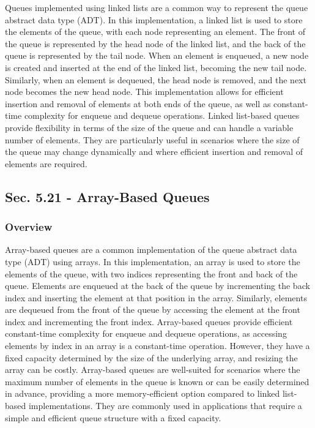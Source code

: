 Queues implemented using linked lists are a common way to represent the queue abstract data type (ADT). In this implementation, a linked list is used to store the elements of the queue, with each node representing an element. The front of the queue is represented by the head node of the linked list, and the back of the queue is represented by the tail node. When an element is enqueued, 
a new node is created and inserted at the end of the linked list, becoming the new tail node. Similarly, when an element is dequeued, the head node is removed, and the next node becomes the new head node. This implementation allows for efficient insertion and removal of elements at both ends of the queue, as well as constant-time complexity for enqueue and dequeue operations. Linked list-based 
queues provide flexibility in terms of the size of the queue and can handle a variable number of elements. They are particularly useful in scenarios where the size of the queue may change dynamically and where efficient insertion and removal of elements are required.

\subsection*{Sec. 5.21 - Array-Based Queues}

\subsubsection{Overview}

Array-based queues are a common implementation of the queue abstract data type (ADT) using arrays. In this implementation, an array is used to store the elements of the queue, with two indices representing the front and back of the queue. Elements are enqueued at the back of the queue by incrementing the back index and inserting the element at that position in the array. Similarly, elements are 
dequeued from the front of the queue by accessing the element at the front index and incrementing the front index. Array-based queues provide efficient constant-time complexity for enqueue and dequeue operations, as accessing elements by index in an array is a constant-time operation. However, they have a fixed capacity determined by the size of the underlying array, and resizing the array can 
be costly. Array-based queues are well-suited for scenarios where the maximum number of elements in the queue is known or can be easily determined in advance, providing a more memory-efficient option compared to linked list-based implementations. They are commonly used in applications that require a simple and efficient queue structure with a fixed capacity.

